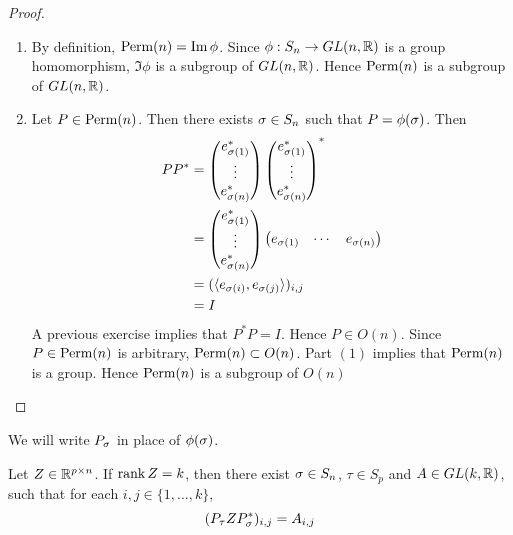 \documentclass{book}
\begin{document}
	\begin{proof}\
		\begin{enumerate}
			\item By definition, $\text{Perm}(n) = \text{Im} \, \phi$. Since $\phi: S_n \rightarrow GL(n, \mathbb{R})$ is a group homomorphism, $\Im \phi$ is a subgroup of $GL(n, \mathbb{R})$. Hence $\text{Perm}(n)$ is a subgroup of $GL(n, \mathbb{R})$.
			\item Let $P \in \text{Perm}(n)$. Then there exists $\sigma \in S_n$ such that $P = \phi(\sigma)$. Then 
			\begin{align*}
				PP^*
				& = 
				\begin{pmatrix}
					e_{\sigma(1)}^* \\
					\vdots \\
					e_{\sigma(n)}^*
				\end{pmatrix} 
				\begin{pmatrix}
					e_{\sigma(1)}^* \\
					\vdots \\
					e_{\sigma(n)}^*
				\end{pmatrix} ^* \\
				& = \begin{pmatrix}
					e_{\sigma(1)}^* \\
					\vdots \\
					e_{\sigma(n)}^*
				\end{pmatrix} 
				\begin{pmatrix}
					e_{\sigma(1)} & \cdots & e_{\sigma(n)}
				\end{pmatrix} \\
				& = (\langle e_{\sigma(i)}, e_{\sigma(j)} \rangle)_{i,j} \\
				& = I
			\end{align*}
			A previous exercise implies that $P^*P = I$. Hence $P \in O(n)$. Since $P \in \text{Perm}(n)$ is arbitrary, $\text{Perm}(n) \subset O(n)$. Part $(1)$ implies that $\text{Perm}(n)$ is a group. Hence $\text{Perm}(n)$ is a subgroup of $O(n)$
		\end{enumerate}
	\end{proof}

	\begin{note}
		We will write $P_{\sigma}$ in place of $\phi(\sigma)$.
	\end{note}

	\begin{ex}
		Let $Z \in \mathbb{R}^{p \times n}$. If $\operatorname{\text{rank}} Z = k$, then there exist $\sigma \in S_n$, $\tau \in S_p$ and $A \in GL(k, \mathbb{R})$, such that for each $i,j \in \{1, \ldots, k\}$,
		$$(P_{\tau} Z P^*_{\sigma})_{i, j} = A_{i,j} $$
	\end{ex}
\end{document}
